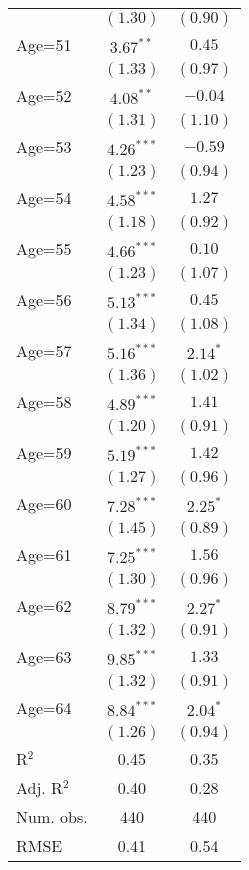 \documentclass[fullpage]{paper}
\begin{document}
\begin{center}
\begin{longtable}{l c c }
            & $(1.30)$     & $(0.90)$      \\
Age=51      & $3.67^{**}$  & $0.45$        \\
            & $(1.33)$     & $(0.97)$      \\
Age=52      & $4.08^{**}$  & $-0.04$       \\
            & $(1.31)$     & $(1.10)$      \\
Age=53      & $4.26^{***}$ & $-0.59$       \\
            & $(1.23)$     & $(0.94)$      \\
Age=54      & $4.58^{***}$ & $1.27$        \\
            & $(1.18)$     & $(0.92)$      \\
Age=55      & $4.66^{***}$ & $0.10$        \\
            & $(1.23)$     & $(1.07)$      \\
Age=56      & $5.13^{***}$ & $0.45$        \\
            & $(1.34)$     & $(1.08)$      \\
Age=57      & $5.16^{***}$ & $2.14^{*}$    \\
            & $(1.36)$     & $(1.02)$      \\
Age=58      & $4.89^{***}$ & $1.41$        \\
            & $(1.20)$     & $(0.91)$      \\
Age=59      & $5.19^{***}$ & $1.42$        \\
            & $(1.27)$     & $(0.96)$      \\
Age=60      & $7.28^{***}$ & $2.25^{*}$    \\
            & $(1.45)$     & $(0.89)$      \\
Age=61      & $7.25^{***}$ & $1.56$        \\
            & $(1.30)$     & $(0.96)$      \\
Age=62      & $8.79^{***}$ & $2.27^{*}$    \\
            & $(1.32)$     & $(0.91)$      \\
Age=63      & $9.85^{***}$ & $1.33$        \\
            & $(1.32)$     & $(0.91)$      \\
Age=64      & $8.84^{***}$ & $2.04^{*}$    \\
            & $(1.26)$     & $(0.94)$      \\
\hline
R$^2$       & 0.45         & 0.35          \\
Adj. R$^2$  & 0.40         & 0.28          \\
Num. obs.   & 440          & 440           \\
RMSE        & 0.41         & 0.54          \\
\end{longtable}
\end{center}
\end{document}
